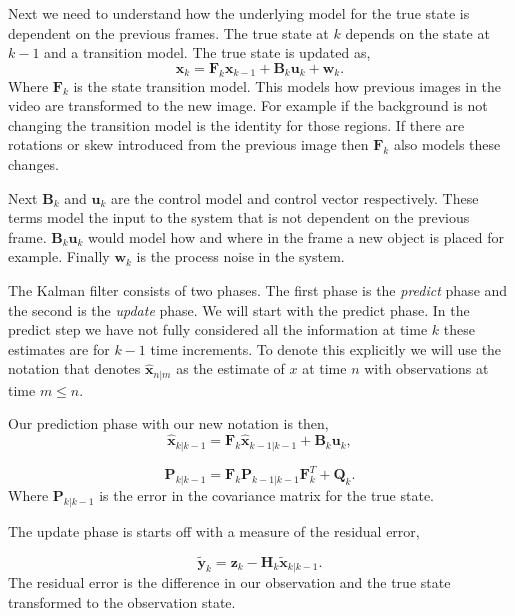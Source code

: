 Next we need to understand how the underlying model for the true state is dependent on the previous frames. The true state at $k$ depends on the state at $k-1$ and a transition model. The true state is updated as,	
\begin{equation}
\mathbf{x}_k = \mathbf{F}_k\mathbf{x}_{k-1} + \mathbf{B}_k\mathbf{u}_{k} + \mathbf{w}_k.
\end{equation}
\noindent
Where $\mathbf{F}_k$ is the state transition model. This models how previous images in the video are transformed to the new image. For example if the background is not changing the transition model is the identity for those regions. If there are rotations or skew introduced from the previous image then $\mathbf{F}_k$ also models these changes.

Next $\mathbf{B}_k$ and $\mathbf{u}_{k}$ are the control model and control vector respectively. These terms model the input to the system that is not dependent on the previous frame. $\mathbf{B}_k\mathbf{u}_{k}$ would model how and where in the frame a new object is placed for example. Finally $\mathbf{w}_k$ is the process noise in the system.

The Kalman filter consists of two phases. The first phase is the \emph{predict} phase and the second is the \emph{update} phase. We will start with the predict phase. In the predict step we have not fully considered all the information at time $k$ these estimates are for $k-1$ time increments. To denote this explicitly we will use the notation that denotes $\hat{\mathbf{x}}_{n|m}$ as the estimate of $x$ at time $n$ with observations at time $m\leq n$.

Our prediction phase with our new notation is then,
\begin{equation}
\hat{\mathbf{x}}_{k|k-1} = \mathbf{F}_k\hat{\mathbf{x}}_{k-1|k-1} + \mathbf{B}_k\mathbf{u}_k,
\end{equation}

\begin{equation}
\mathbf{P}_{k|k-1} = \mathbf{F}_k\mathbf{P}_{k-1|k-1}\mathbf{F}_k^T + \mathbf{Q}_k.
\end{equation}
\noindent
Where $\mathbf{P}_{k|k-1}$ is the error in the covariance matrix for the true state. 

The update phase is starts off with a measure of the residual error,

\begin{equation}
\tilde{\mathbf{y}}_k = \mathbf{z}_k - \mathbf{H}_{k}\tilde{\mathbf{x}}_{k|k-1}.
\end{equation}
\noindent
The residual error is the difference in our observation and the true state transformed to the observation state. 

